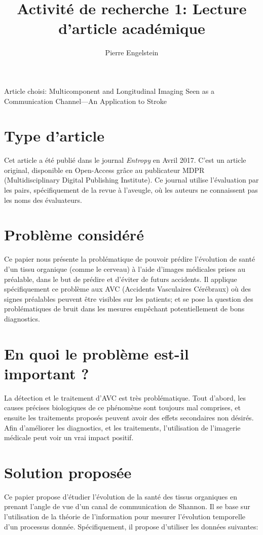\documentclass[12pt,a4paper]{article}
\title{Activité de recherche 1: Lecture d'article académique}
\author{Pierre Engelstein}
\date{}
\begin{document}
\maketitle

Article choisi: Multicomponent and Longitudinal Imaging Seen as a Communication Channel—An Application to Stroke

\section{Type d'article}

Cet article a été publié dans le journal \textit{Entropy} en Avril 2017. C'est un article original, disponible en Open-Access grâce au publicateur MDPR (Multidisciplinary Digital Publishing Institute). Ce journal utilise l'évaluation par les pairs, spécifiquement de la revue à l'aveugle, où les auteurs ne connaissent pas les noms des évaluateurs.

\section{Problème considéré}

Ce papier nous présente la problématique de pouvoir prédire l'évolution de santé d'un tissu organique (comme le cerveau) à l'aide d'images médicales prises au préalable, dans le but de prédire et d'éviter de futurs accidents. Il applique spécifiquement ce problème aux AVC (Accidents Vasculaires Cérébraux) où des signes préalables peuvent être visibles sur les patients; et se pose la question des problématiques de bruit dans les mesures empêchant potentiellement de bons diagnostics.

\section{En quoi le problème est-il important ?}
La détection et le traitement d'AVC est très problématique. Tout d'abord, les causes précises biologiques de ce phénomène sont toujours mal comprises, et ensuite les traitements proposés peuvent avoir des effets secondaires non désirés. Afin d'améliorer les diagnostics, et les traitements, l'utilisation de l'imagerie médicale peut voir un vrai impact positif.


\section{Solution proposée}

Ce papier propose d'étudier l'évolution de la santé des tissus organiques en prenant l'angle de vue d'un canal de communication de Shannon. Il se base sur l'utilisation de la théorie de l'information pour mesurer l'évolution temporelle d'un processus donnée. Spécifiquement, il propose d'utiliser les données suivantes:
\end{document}
